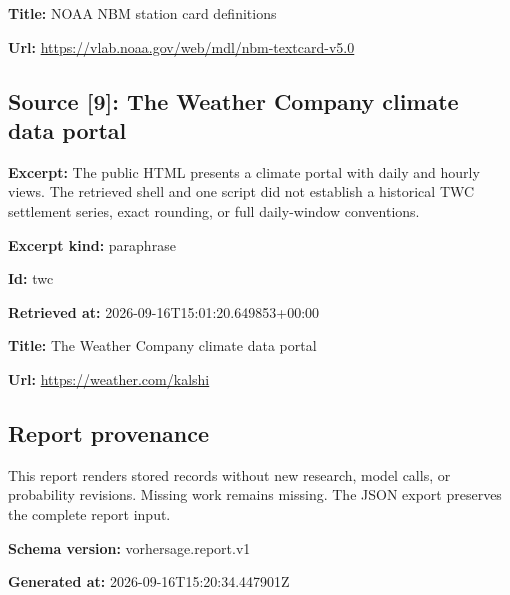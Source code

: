 \documentclass[11pt]{article}
\begin{document}
\par\noindent\textbf{Title:} NOAA NBM station card definitions

\par\noindent\textbf{Url:} \href{https://vlab.noaa.gov/web/mdl/nbm-textcard-v5.0}{https://vlab\hspace{0pt}.noaa.gov/we\hspace{0pt}b/mdl/nbm-te\hspace{0pt}xtcard-v5.0}

\subsection*{\textcolor{epdarkgreen}{Source [9]: The Weather Company climate data portal}}
\par\noindent\textbf{Excerpt:} The public HTML presents a climate portal with daily and hourly views. The retrieved shell and one script did not establish a historical TWC settlement series, exact rounding, or full daily-window conventions.

\par\noindent\textbf{Excerpt kind:} paraphrase

\par\noindent\textbf{Id:} twc

\par\noindent\textbf{Retrieved at:} 2026-09-16T1\hspace{0pt}5:01:20.6498\hspace{0pt}53+00:00

\par\noindent\textbf{Title:} The Weather Company climate data portal

\par\noindent\textbf{Url:} \href{https://weather.com/kalshi}{https://weather.com/kalshi}

\subsection*{\textcolor{epdarkgreen}{Report provenance}}
This report renders stored records without new research, model calls, or probability revisions. Missing work remains missing. The JSON export preserves the complete report input.


\par\noindent\textbf{Schema version:} vorhersage.report.v1

\par\noindent\textbf{Generated at:} 2026-09-16T15:20:34.447901Z
\end{document}
